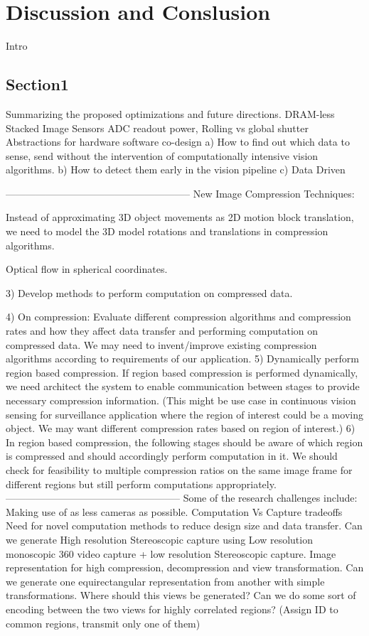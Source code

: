 \chapter{Discussion and Conslusion}
Intro 
\section{Section1}
Summarizing the proposed optimizations and future directions.
DRAM-less
Stacked Image Sensors
ADC readout power, Rolling vs global shutter
Abstractions for hardware software co-design
a) How to find out which data to sense, send without the intervention of computationally intensive vision algorithms.
b) How to detect them early in the vision pipeline
c) Data Driven 

--------------------------------------------------------
    New Image Compression Techniques:​

Instead of approximating 3D object movements as 2D motion block translation, we need to model the 3D model rotations and translations in compression algorithms.

Optical flow in spherical coordinates.
	
3) 
Develop methods to perform computation on compressed data.


4)
On compression: 
Evaluate different compression algorithms and compression rates and how they affect data transfer and performing computation on compressed data. We may need to invent/improve existing compression algorithms according to requirements of our application.
5) 
Dynamically perform region based compression. If region based compression is performed dynamically, we need architect the system to enable communication between stages to provide necessary compression information. (This might be use case in continuous vision sensing for surveillance application where the region of interest could be a moving object. We may want different compression rates based on region of interest.) 
6)
In region based compression, the following stages should be aware of which region is compressed and should accordingly​ perform computation in it. We should check for feasibility  to multiple compression ratios on the same image frame for different regions but still perform computations appropriately. 
-----------------------------------------------------
Some of the research challenges include:
Making use of as less cameras as possible.
Computation Vs Capture tradeoffs
Need for novel computation methods to reduce design size and data transfer.
Can we generate High resolution Stereoscopic capture using Low resolution monoscopic 360 video capture + low resolution Stereoscopic capture.
Image representation for high compression, decompression and view transformation.
Can we generate one equirectangular representation from another with simple transformations. 
Where should this views be generated?
Can we do some sort of encoding between the two views for highly correlated regions? (Assign ID to common regions, transmit only one of them)

